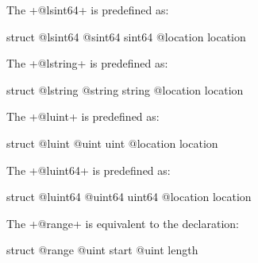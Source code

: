 
The \ggs+@lsint64+ is predefined as:
\begin{galgascode}
struct @lsint64 {
  @sint64 sint64
  @location location
}
\end{galgascode}








The \ggs+@lstring+ is predefined as:
\begin{galgascode}
struct @lstring {
  @string string
  @location location
}
\end{galgascode}








The \ggs+@luint+ is predefined as:
\begin{galgascode}
struct @luint {
  @uint uint
  @location location
}
\end{galgascode}






The \ggs+@luint64+ is predefined as:
\begin{galgascode}
struct @luint64 {
  @uint64 uint64
  @location location
}
\end{galgascode}



The \ggs+@range+ is equivalent to the declaration:
\begin{galgascode}
struct @range {
  @uint start
  @uint length
}
\end{galgascode}


